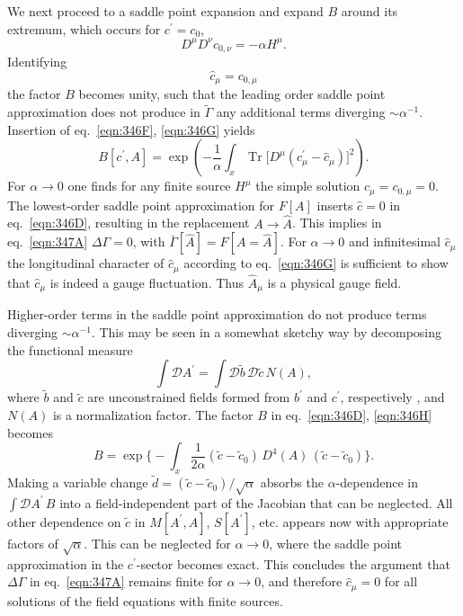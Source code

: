 \documentclass[twocolumn,aps,prd,amsmath,amssymb,preprintnumbers,longbibliography]{revtex4-1}
\numberwithin{equation}{section}
\DeclareMathOperator{\Tr}{Tr}
\begin{document}
We next proceed to a saddle point expansion and expand $B$ around its extremum, which occurs for $c^\prime = c_0$,
\begin{equation}\label{eqn:346F}
	D^\mu D^\nu c_{0,\nu}
	= -\alpha H^\mu.
\end{equation}
Identifying
\begin{equation}\label{eqn:346G}
	\hat{c}_\mu
	= c_{0,\mu}
\end{equation}
the factor $B$ becomes unity, such that the leading order saddle point approximation does not produce in $\tilde\Gamma$ any additional terms diverging $\sim \alpha^{-1}$. Insertion of eq.~\eqref{eqn:346F}, \eqref{eqn:346G} yields
\begin{equation}\label{eqn:346H}
	B[c^\prime,A]
	= \exp\left(-\frac{1}{\alpha} \int_x \Tr\bigl[D^\mu(c^\prime_\mu - \hat{c}_\mu)\bigr]^2\right).
\end{equation}
For $\alpha \to 0$ one finds for any finite source $H^\mu$ the simple solution $\hat{c}_\mu = c_{0,\mu} = 0$. The lowest-order saddle point approximation for $F[A]$ inserts $\hat{c} = 0$ in eq.~\eqref{eqn:346D}, resulting in the replacement $A \to \hat{A}$. This implies in eq.~\eqref{eqn:347A} $\Delta\Gamma = 0$, with $\bar\Gamma[\hat{A}] = F[A=\hat{A}]$. For $\alpha \to 0$ and infinitesimal $\hat{c}_\mu$ the longitudinal character of $\hat{c}_\mu$ according to eq.~\eqref{eqn:346G} is sufficient to show that $\hat{c}_\mu$ is indeed a gauge fluctuation. Thus $\hat{A}_\mu$ is a physical gauge field.

Higher-order terms in the saddle point approximation do not produce terms diverging $\sim \alpha^{-1}$. This may be seen in a somewhat sketchy way by decomposing the functional measure
\begin{equation}\label{eqn:346I}
	\int \mathcal{D} A^\prime
	= \int \mathcal{D}\tilde{b} \, \mathcal{D}\tilde{c} \, N(A),
\end{equation}
where $\tilde{b}$ and $\tilde{c}$ are unconstrained fields formed from $b^\prime$ and $c^\prime$, respectively \cite{CWGD}, and $N(A)$ is a normalization factor. The factor $B$ in eq.~\eqref{eqn:346D}, \eqref{eqn:346H} becomes
\begin{equation}
	B
	= \exp\biggl\{-\int_x \frac{1}{2 \alpha} (\tilde{c} - \tilde{c}_0) \, D^4(A) \, (\tilde{c} - \tilde{c}_0)\biggr\}.
\end{equation}
Making a variable change $\tilde{d} = (\tilde{c} - \tilde{c}_0)/\sqrt{\alpha}$ absorbs the $\alpha$-dependence in $\int \mathcal{D} A^\prime \, B$ into a field-independent part of the Jacobian that can be neglected. All other dependence on $\tilde{c}$ in $M[A^\prime,A]$, $S[A^\prime]$, etc. appears now with appropriate factors of $\sqrt{\alpha}$. This can be neglected for $\alpha \to 0$, where the saddle point approximation in the $c^\prime$-sector becomes exact. This concludes the argument that $\Delta \Gamma$ in eq.~\eqref{eqn:347A} remains finite for $\alpha \to 0$, and therefore $\hat{c}_\mu = 0$ for all solutions of the field equations with finite sources.
\end{document}
